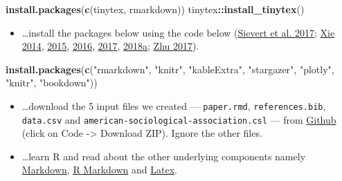 \documentclass[
  12pt,
]{article}
\newenvironment{Shaded}{\begin{snugshade}}{\end{snugshade}}
\newcommand{\FunctionTok}[1]{\textcolor[rgb]{0.13,0.29,0.53}{\textbf{#1}}}
\newcommand{\NormalTok}[1]{#1}
\newcommand{\SpecialCharTok}[1]{\textcolor[rgb]{0.81,0.36,0.00}{\textbf{#1}}}
\newcommand{\StringTok}[1]{\textcolor[rgb]{0.31,0.60,0.02}{#1}}
\providecommand{\tightlist}{%
  \setlength{\itemsep}{0pt}\setlength{\parskip}{0pt}}
\begin{document}
\begin{Shaded}
\begin{Highlighting}[]
\FunctionTok{install.packages}\NormalTok{(}\FunctionTok{c}\NormalTok{(}\StringTok{\textquotesingle{}tinytex\textquotesingle{}}\NormalTok{, }\StringTok{\textquotesingle{}rmarkdown\textquotesingle{}}\NormalTok{))}
\NormalTok{tinytex}\SpecialCharTok{::}\FunctionTok{install\_tinytex}\NormalTok{()}
\end{Highlighting}
\end{Shaded}

\begin{itemize}
\tightlist
\item
  \ldots install the packages below using the code below
  (\protect\hyperlink{ref-plotly}{Sievert et al. 2017};
  \protect\hyperlink{ref-knitr3}{Xie 2014},
  \protect\hyperlink{ref-knitr2}{2015},
  \protect\hyperlink{ref-bookdown2}{2016},
  \protect\hyperlink{ref-bookdown1}{2017},
  \protect\hyperlink{ref-knitr1}{2018a};
  \protect\hyperlink{ref-kableextra}{Zhu 2017}).
\end{itemize}

\begin{Shaded}
\begin{Highlighting}[]
\FunctionTok{install.packages}\NormalTok{(}\FunctionTok{c}\NormalTok{(}\StringTok{"rmarkdown"}\NormalTok{, }\StringTok{"knitr"}\NormalTok{, }\StringTok{"kableExtra"}\NormalTok{,}
                   \StringTok{"stargazer"}\NormalTok{, }\StringTok{"plotly"}\NormalTok{, }\StringTok{"knitr"}\NormalTok{,}
                   \StringTok{"bookdown"}\NormalTok{))}
\end{Highlighting}
\end{Shaded}

\begin{itemize}
\item
  \ldots download the 5 input files we created --- \texttt{paper.rmd},
  \texttt{references.bib}, \texttt{data.csv} and
  \texttt{american-sociological-association.csl} --- from
  \href{https://github.com/paulcbauer/Writing_a_reproducable_paper_in_rmarkdown}{Github}
  (click on Code -\textgreater{} Download ZIP). Ignore the other files.
\item
  \ldots learn R and read about the other underlying components namely
  \href{https://en.wikipedia.org/wiki/Markdown}{Markdown},
  \href{https://rmarkdown.rstudio.com/lesson-1.html}{R Markdown} and
  \href{https://en.wikipedia.org/wiki/LaTeX}{Latex}.
\end{itemize}
\end{document}
